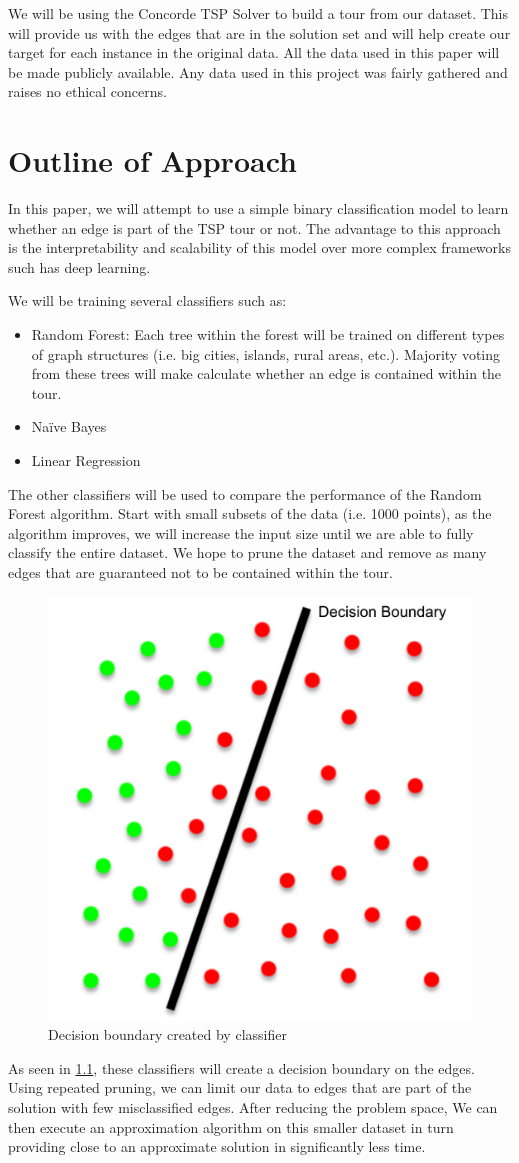 \documentclass[]{UCD_CS_FYP_Report}
\begin{document}
We will be using the Concorde TSP Solver \cite{davidapplegate2007} to build a tour from our dataset. This will provide us with the edges that are in the solution set and will help create our target for each instance in the original data.
All the data used in this paper will be made publicly available. Any data used in this project was fairly gathered and raises no ethical concerns.


\chapter{Outline of Approach}
In this paper, we will attempt to use a simple binary classification model to learn whether an edge is part of the TSP tour or not. The advantage to this approach is the interpretability and scalability of this model over more complex frameworks such has deep learning.

We will be training several classifiers such as:
\begin{itemize}
    \item Random Forest: Each tree within the forest will be trained on different types of graph structures (i.e. big cities, islands, rural areas, etc.). Majority voting from these trees will make calculate whether an edge is contained within the tour. 
    \item Naïve Bayes
    \item Linear Regression
\end{itemize}

The other classifiers will be used to compare the performance of the Random Forest algorithm.
Start with small subsets of the data (i.e. 1000 points), as the algorithm improves, we will increase the input size until we are able to fully classify the entire dataset.
We hope to prune the dataset and remove as many edges that are guaranteed not to be contained within the tour. 

\begin{figure}[h]
    \centering
  \includegraphics[width=0.5\linewidth]{Figures/Prune.pdf}
  \caption{Decision boundary created by classifier}
  \label{fig:Prune}
\end{figure}
As seen in \ref{fig:Prune}, these classifiers will create a decision boundary on the edges. Using repeated pruning, we can limit our data to edges that are part of the solution with few misclassified edges. After reducing the problem space, We can then execute an approximation algorithm on this smaller dataset in turn providing close to an approximate solution in significantly less time.
\end{document}
